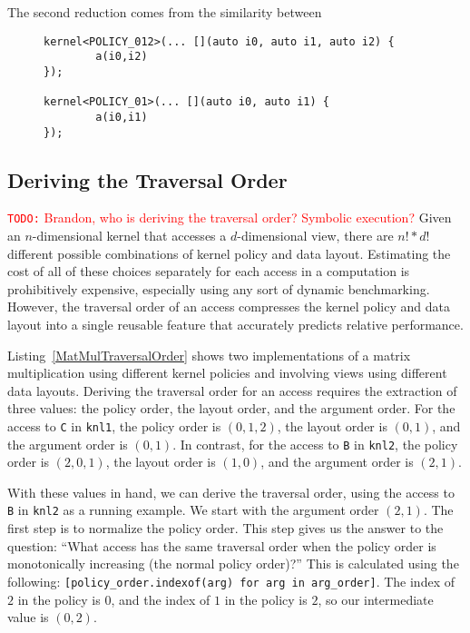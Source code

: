 \documentclass[sigconf, table]{acmart}
\newcommand{\todo}[1]{{\textcolor{red}{{\tt{TODO:}}\,\,#1 }}}
\begin{document}
The second reduction comes from the similarity between 
\begin{figure}
	\begin{lstlisting}[caption={Equivalent loops for second reduction process.}, label={reduction2}]
kernel<POLICY_012>(... [](auto i0, auto i1, auto i2) {
		a(i0,i2)
});

kernel<POLICY_01>(... [](auto i0, auto i1) {
		a(i0,i1)
});
	\end{lstlisting}
\end{figure}


\subsection{Deriving the Traversal Order}

\todo{Brandon, who is deriving the traversal order?  Symbolic execution?}
Given an $n$-dimensional kernel that accesses a $d$-dimensional view, there are $n! * d!$ different possible combinations of kernel policy and data layout. 
Estimating the cost of all of these choices separately for each access in a computation is prohibitively expensive, especially using any sort of dynamic benchmarking. 
However, the traversal order of an access compresses the kernel policy and data layout into a single reusable feature that accurately predicts relative performance.




Listing~\ref{MatMulTraversalOrder} shows two implementations of a matrix multiplication using different kernel policies and involving views using different data layouts.
Deriving the traversal order for an access requires the extraction of three values: the policy order, the layout order, and the argument order. 
For the access to \verb.C. in \verb.knl1., the policy order is $(0,1,2)$, the layout order is $(0,1)$, and the argument order is $(0,1)$. 
In contrast, for the access to \verb.B. in \verb.knl2., the policy order is $(2,0,1)$, the layout order is $(1,0)$, and the argument order is $(2,1)$. 

With these values in hand, we can derive the traversal order, using the access to \verb.B. in \verb.knl2. as a running example. 
We start with the argument order $(2,1)$.
The first step is to normalize the policy order.
This step gives us the answer to the question: \enquote{What access has the same traversal order when the policy order is monotonically increasing (the normal policy order)?}
This is calculated using the following: \verb,[policy_order.indexof(arg) for arg in arg_order],. 
The index of $2$ in the policy is $0$, and the index of $1$ in the policy is $2$, so our intermediate value is $(0,2)$. 
\end{document}
